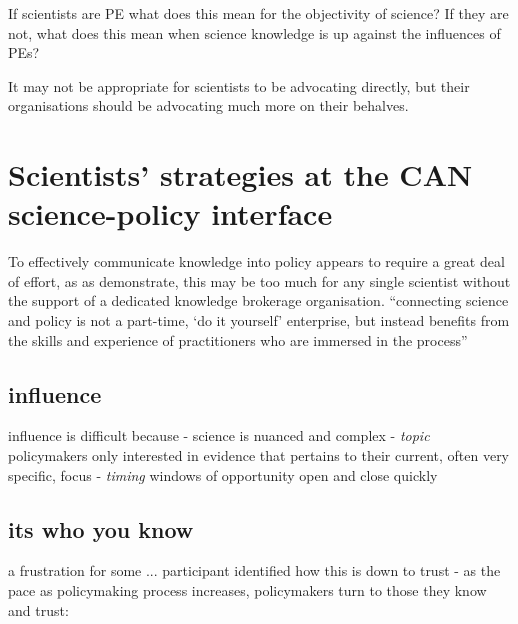 If scientists are PE what does this mean for the objectivity of science?
If they are not, what does this mean when science knowledge is up against the influences of PEs?


It may not be appropriate for scientists to be advocating directly, but their organisations should be advocating much more on their behalves.


\section{Scientists' strategies at the CAN science-policy interface}\label{sec:disstrat}

To effectively communicate knowledge into policy appears to require a great deal of effort, as as \textcite{BednarekSHG2015} demonstrate, this may be too much for any single scientist without the support of a dedicated knowledge brokerage organisation. ``connecting science and policy is not a part-time, `do it yourself' enterprise, but instead benefits from the skills and experience of practitioners who are immersed in the process''

\subsection{influence}
influence is difficult because
- \emph{} science is nuanced and complex
- \emph{topic} policymakers only interested in evidence that pertains to their current, often very specific, focus
- \emph{timing} windows of opportunity open and close quickly

\subsection{its who you know}
a frustration for some ...
participant identified how this is down to trust - as the pace as policymaking process increases, policymakers turn to those they know and trust: 

